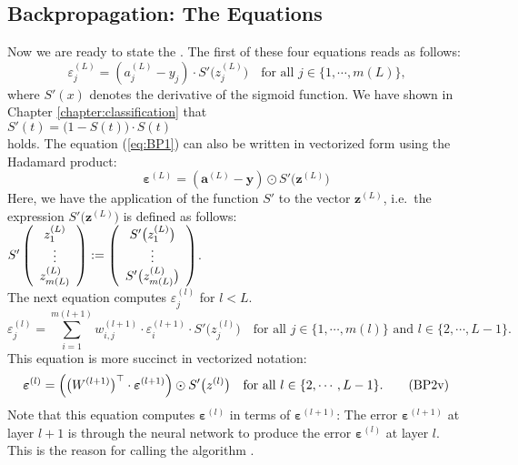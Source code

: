 \subsection{Backpropagation: The Equations}
Now we are ready to state the .  The first of these four equations reads as follows:
\begin{equation}
  \label{eq:BP1}
  \varepsilon^{(L)}_j = (a_j^{(L)} - y_j) \cdot S'\bigl(z_j^{(L)}\bigr)
 \quad \mbox{for all $j \in \{1, \cdots, m(L)\}$,}
  \tag{BP1}
\end{equation}
where $S'(x)$ denotes the derivative of the sigmoid function.  We have shown in Chapter
\ref{chapter:classification} that
\\[0.2cm]
\hspace*{1.3cm}
$S'(t) = \bigl(1 - S(t)\bigr) \cdot S(t)$
\\[0.2cm]
holds.  The equation (\ref{eq:BP1}) can also be written in vectorized form using the Hadamard product:
\begin{equation}
  \label{eq:BP1s}
\boldsymbol{\varepsilon}^{(L)} = (\mathbf{a}^{(L)} - \mathbf{y}) \odot S'\bigl(\mathbf{z}^{(L)}\bigr)  
\tag{BP1v}
\end{equation}
Here, we have  the application of the function $S'$ to the vector $\mathbf{z}^{(L)}$, i.e.~the
expression $S'\bigl(\mathbf{z}^{(L)}\bigr)$ is defined as follows:
\\[0.2cm]
\hspace*{1.3cm}
$ S'\left(
  \begin{array}[c]{c}
   z_1^{(L)}      \\
   \vdots       \\
   z_{m(L)}^{(L)} 
  \end{array}
  \right) := \left(
  \begin{array}[c]{c}
   S'\bigl(z_1^{(L)}\bigr)      \\
   \vdots       \\
   S'\bigl(z_{m(L)}^{(L)}\bigr)
  \end{array}
  \right)
$.
\\[0.2cm]
The next equation computes $\varepsilon_j^{(l)}$ for $l < L$.  
\begin{equation}
  \label{eq:BP2}
  \varepsilon^{(l)}_j = \sum\limits_{i=1}^{m(l+1)} w_{i,j}^{(l+1)} \cdot \varepsilon^{(l+1)}_i \cdot
  S'\bigl(z^{(l)}_j\bigr) \quad \mbox{for all $j \in \{1, \cdots, m(l)\}$ and $l \in \{2, \cdots, L-1\}$}.
  \tag{BP2}
\end{equation}
This equation is more succinct in vectorized notation:
\begin{equation}
  \label{eq:BP2v}
  \boldsymbol{\varepsilon}^{(l)} = \Bigl(\bigl(W^{(l+1)}\bigr)^\top \cdot \boldsymbol{\varepsilon}^{(l+1)}\Bigr) \odot
  S'\bigl(z^{(l)}\bigr) \quad \mbox{for all $l \in \{2, \cdots, L-1\}$}.
  \tag{BP2v}
\end{equation}
Note that this equation computes $\boldsymbol{\varepsilon}^{(l)}$ in terms of  $\boldsymbol{\varepsilon}^{(l+1)}$:  The error 
$\boldsymbol{\varepsilon}^{(l+1)}$ at layer $l+1$ is  through the neural network to produce the
error $\boldsymbol{\varepsilon}^{(l)}$ at layer $l$.  This is the reason for calling the algorithm .

